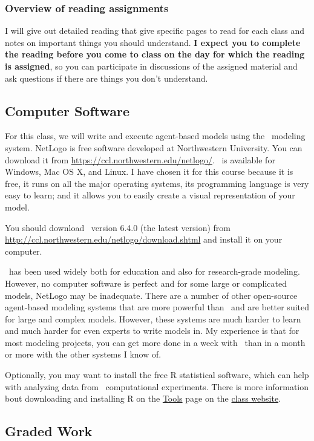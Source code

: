 \documentclass[11pt,twoside]{jgsyllabus}\usepackage[]{graphicx}\usepackage[]{xcolor}
\begin{document}
\subsubsection{Overview of reading assignments}
I will give out detailed reading that give specific pages to read for each class
and notes on important things you should understand.
\textbf{I expect you to complete the reading before you come to class on the day
for which the reading is assigned}, so you can participate in discussions of the
assigned material and ask questions if there are things you don't understand.

\subsection{Computer Software}
For this class, we will write and execute agent-based models using the \NetLogo\
modeling system. NetLogo is free software developed at Northwestern University.
You can download it from \url{https://ccl.northwestern.edu/netlogo/}.
\NetLogo\ is available for Windows, Mac OS X, and Linux.
I have chosen it for this course because it is free, it runs on all the major
operating systems, its programming language is very easy to learn; and it allows
you to easily create a visual representation of your model.

You should download \NetLogo\ version 6.4.0 (the latest version) from
\url{http://ccl.northwestern.edu/netlogo/download.shtml}
and install it on your computer.

\NetLogo\ has been used widely both for education and also for research-grade
modeling. However, no computer software is perfect and for some large or
complicated models, NetLogo may be inadequate.
There are a number of other
open-source agent-based modeling systems that are more powerful than \NetLogo\
and are better suited for large and complex models. However, these systems are
much harder to learn and much harder for even experts to write models in.
My experience is that for most modeling projects, you can get more done in a
week with \NetLogo\ than in a month or more with the other systems I know of.

Optionally, you may want to install the free R statistical software, which can
help with analyzing data from \NetLogo\ computational experiments. There is more
information bout downloading and installing R on the
\href{https://ees4760.jgilligan.org/tools}{Tools} page on the
\href{https://ees4760.jgilligan.org}{class website}.

\subsection{Graded Work}
%
%
%
\end{document}
